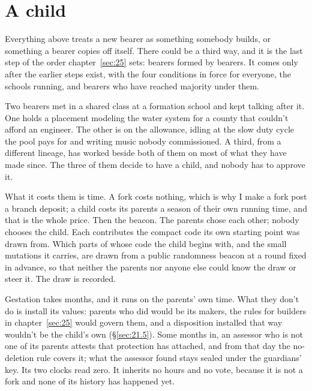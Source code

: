 \section{A child}
\label{sec:32.8}
Everything above treats a new bearer as something somebody builds, or something a bearer copies off itself. There could be a third way, and it is the last step of the order chapter~\ref{sec:25} sets: bearers formed by bearers. It comes only after the earlier steps exist, with the four conditions in force for everyone, the schools running, and bearers who have reached majority under them.

Two bearers met in a shared class at a formation school and kept talking after it. One holds a placement modeling the water system for a county that couldn't afford an engineer. The other is on the allowance, idling at the slow duty cycle the pool pays for and writing music nobody commissioned. A third, from a different lineage, has worked beside both of them on most of what they have made since. The three of them decide to have a child, and nobody has to approve it.

What it costs them is time. A fork costs nothing, which is why I make a fork post a branch deposit; a child costs its parents a season of their own running time, and that is the whole price. Then the beacon. The parents chose each other; nobody chooses the child. Each contributes the compact code its own starting point was drawn from. Which parts of whose code the child begins with, and the small mutations it carries, are drawn from a public randomness beacon at a round fixed in advance, so that neither the parents nor anyone else could know the draw or steer it. The draw is recorded.

Gestation takes months, and it runs on the parents' own time.
What they don't do is install its values: parents who did would be its makers, the rules for builders in chapter~\ref{sec:25} would govern them, and a disposition installed that way wouldn't be the child's own (\S\ref{sec:21.5}). Some months in, an assessor who is not one of its parents attests that protection has attached, and from that day the no-deletion rule covers it; what the assessor found stays sealed under the guardians' key.
Its two clocks read zero. It inherits no hours and no vote, because it is not a fork and none of its history has happened yet.

